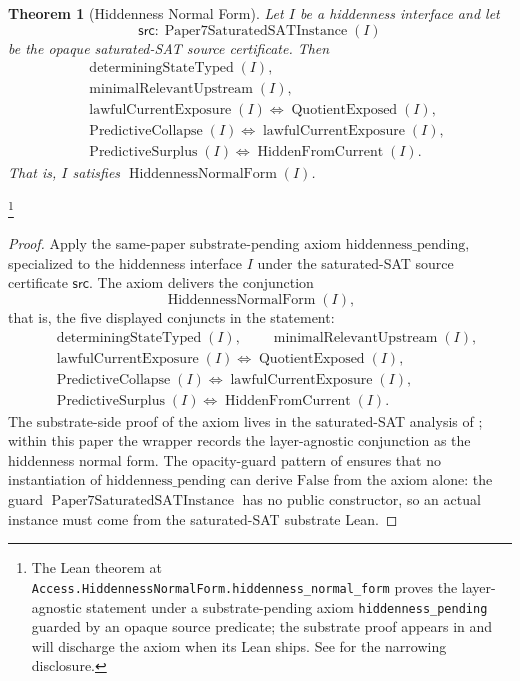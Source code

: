 \documentclass[11pt]{article}
\newtheorem{theorem}{Theorem}[section]
\theoremstyle{definition}
\begin{document}
\begin{theorem}[Hiddenness Normal Form]\label{thm:F13a}
Let \(I\) be a hiddenness interface and let
\[
  \mathsf{src}:
  \operatorname{Paper7SaturatedSATInstance}(I)
\]
be the opaque saturated-SAT source certificate.  Then
\begin{align*}
  &\operatorname{determiningStateTyped}(I),\\
  &\operatorname{minimalRelevantUpstream}(I),\\
  &\operatorname{lawfulCurrentExposure}(I)
    \iff \operatorname{QuotientExposed}(I),\\
  &\operatorname{PredictiveCollapse}(I)
    \iff \operatorname{lawfulCurrentExposure}(I),\\
  &\operatorname{PredictiveSurplus}(I)
    \iff \operatorname{HiddenFromCurrent}(I).
\end{align*}
That is, \(I\) satisfies
\(\operatorname{HiddennessNormalForm}(I)\).
\end{theorem}
\footnote{The Lean theorem at
\texttt{Access.HiddennessNormalForm.hiddenness\_normal\_form}
proves the layer-agnostic statement under a substrate-pending axiom
\texttt{hiddenness\_pending} guarded by an opaque source predicate;
the substrate proof appears in \citep{Tsiokos2026PvNP} and will
discharge the axiom when its Lean ships.  See
 for the narrowing disclosure.}
\begin{proof}
Apply the same-paper substrate-pending axiom
\(\mathrm{hiddenness\_pending}\), specialized to the hiddenness
interface \(I\) under the saturated-SAT source certificate \(\mathsf{src}\).
The axiom delivers the conjunction
\[
  \operatorname{HiddennessNormalForm}(I),
\]
that is, the five displayed conjuncts in the statement:
\begin{align*}
  &\operatorname{determiningStateTyped}(I),\qquad
  \operatorname{minimalRelevantUpstream}(I),\\
  &\operatorname{lawfulCurrentExposure}(I)
    \iff \operatorname{QuotientExposed}(I),\\
  &\operatorname{PredictiveCollapse}(I)
    \iff \operatorname{lawfulCurrentExposure}(I),\\
  &\operatorname{PredictiveSurplus}(I)
    \iff \operatorname{HiddenFromCurrent}(I).
\end{align*}
The substrate-side proof of the axiom lives in the saturated-SAT
analysis of \citet{Tsiokos2026PvNP}; within this paper the
wrapper records the layer-agnostic conjunction as the hiddenness
normal form.  The opacity-guard pattern of 
ensures that no instantiation of \(\mathrm{hiddenness\_pending}\) can
derive \(\mathrm{False}\) from the axiom alone: the guard
\(\operatorname{Paper7SaturatedSATInstance}\) has no public
constructor, so an actual instance must come from the saturated-SAT
substrate Lean.
\end{proof}
\end{document}
